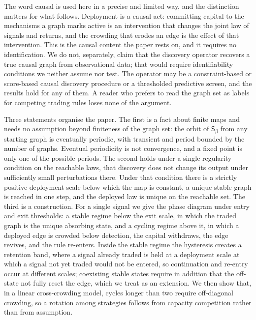 \documentclass[11pt]{article}
\theoremstyle{plain}
\theoremstyle{definition}
\newcommand{\Sbeta}{\mathsf{S}_\beta}
\begin{document}
The word causal is used here in a precise and limited way, and the distinction matters for what follows. Deployment is a causal act: committing capital to the mechanisms a graph marks active is an intervention that changes the joint law of signals and returns, and the crowding that erodes an edge is the effect of that intervention. This is the causal content the paper rests on, and it requires no identification. We do not, separately, claim that the discovery operator recovers a true causal graph from observational data; that would require identifiability conditions we neither assume nor test. The operator may be a constraint-based or score-based causal discovery procedure \citep{spirtes2000, chickering2002} or a thresholded predictive screen, and the results hold for any of them. A reader who prefers to read the graph set as labels for competing trading rules loses none of the argument.

Three statements organise the paper. The first is a fact about finite maps and needs no assumption beyond finiteness of the graph set: the orbit of $\Sbeta$ from any starting graph is eventually periodic, with transient and period bounded by the number of graphs. Eventual periodicity is not convergence, and a fixed point is only one of the possible periods. The second holds under a single regularity condition on the reachable laws, that discovery does not change its output under sufficiently small perturbations there. Under that condition there is a strictly positive deployment scale below which the map is constant, a unique stable graph is reached in one step, and the deployed law is unique on the reachable set. The third is a construction. For a single signal we give the phase diagram under entry and exit thresholds: a stable regime below the exit scale, in which the traded graph is the unique absorbing state, and a cycling regime above it, in which a deployed edge is crowded below detection, the capital withdraws, the edge revives, and the rule re-enters. Inside the stable regime the hysteresis creates a retention band, where a signal already traded is held at a deployment scale at which a signal not yet traded would not be entered, so continuation and re-entry occur at different scales; coexisting stable states require in addition that the off-state not fully reset the edge, which we treat as an extension. We then show that, in a linear cross-crowding model, cycles longer than two require off-diagonal crowding, so a rotation among strategies follows from capacity competition rather than from assumption.
\end{document}
